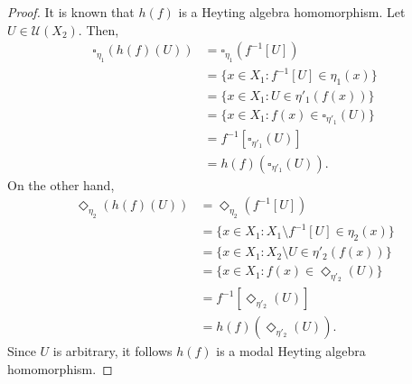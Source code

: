 \documentclass[10pt,a4paper]{amsart}
\begin{document}
\begin{proof}
It is known that $h(f)$ is a Heyting algebra homomorphism. Let $U\in \mathcal{U}(X_2)$. Then,
    \begin{align*}
    \square_{\eta_1}(h(f)(U))&=\square_{\eta_1}(f^{-1}[U])\\&=\{x\in X_1:f^{-1}[U]\in\eta_1(x)\}\\&=\{x\in X_1:U\in\eta'_1(f(x))\}\\&=\{x\in X_1:f(x)\in\square_{\eta'_1}(U)\}\\&=f^{-1}[\square_{\eta'_1}(U)]\\&=h(f)(\square_{\eta'_1}(U)).
    \end{align*}
On the other hand,
    \begin{align*}
        \Diamond_{\eta_2}(h(f)(U))&=\Diamond_{\eta_2}(f^{-1}[U])\\&=\{x\in X_1:X_1\setminus f^{-1}[U]\in\eta_2(x)\}\\&=\{x\in X_1:X_2\setminus U\in\eta'_2(f(x))\}\\&=\{x\in X_1:f(x)\in\Diamond_{\eta'_2}(U)\}\\&=f^{-1}[\Diamond_{\eta'_2}(U)]\\&=h(f)(\Diamond_{\eta'_2}(U)).
    \end{align*}
    Since $U$ is arbitrary, it follows $h(f)$ is a modal Heyting algebra homomorphism.
\end{proof}
\end{document}
